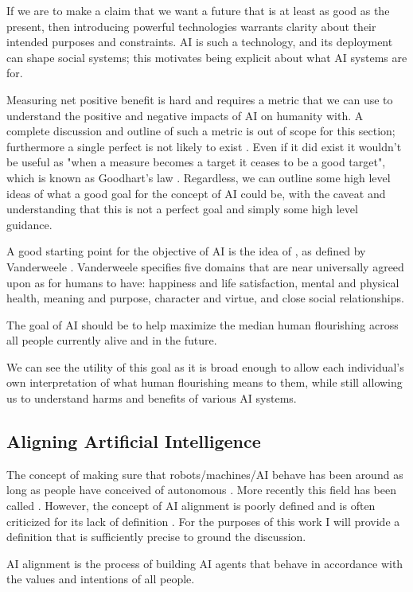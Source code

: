 If we are to make a claim that we want a future that is at least as good as the present, then introducing powerful technologies warrants clarity about their intended purposes and constraints. AI is such a technology, and its deployment can shape social systems; this motivates being explicit about what AI systems are for.

Measuring net positive benefit is hard and requires a metric that we can use to understand the positive and negative impacts of AI on humanity with. A complete discussion and outline of such a metric is out of scope for this section; furthermore a single perfect  is not likely to exist \cite{amodeiConcreteProblemsAI2016a}. Even if it did exist it wouldn't be useful as "when a measure becomes a target it ceases to be a good target", which is known as Goodhart's law \cite{Goodhart1975}. Regardless, we can outline some high level ideas of what a good goal for the concept of AI could be, with the caveat and understanding that this is not a perfect goal and simply some high level guidance.

A good starting point for the objective of AI is the idea of , as defined by Vanderweele \cite{vanderweelePromotionHumanFlourishing2017}. Vanderweele specifies five domains that are near universally agreed upon as  for humans to have: happiness and life satisfaction, mental and physical health, meaning and purpose, character and virtue, and close social relationships. 

\begin{definition}
\label{def:goalai}
The goal of AI should be to help maximize the median human flourishing across all people currently alive and in the future. 
\end{definition}

We can see the utility of this goal as it is broad enough to allow each individual's own interpretation of what human flourishing means to them, while still allowing us to understand harms and benefits of various AI systems.

\subsection{Aligning Artificial Intelligence}

The concept of making sure that robots/machines/AI behave  has been around as long as people have conceived of autonomous  \cite{asimovRobot1950,wienerHumanUseHuman2025}. More recently this field has been called . However, the concept of AI alignment is poorly defined and is often criticized for its lack of definition \cite{kirkEmptySignifierProblem2023}. For the purposes of this work I will provide a definition that is sufficiently precise to ground the discussion.
\begin{definition}[AI Alignment]
    AI alignment is the process of building AI agents that behave in accordance with the values and intentions of all people.
\end{definition}

